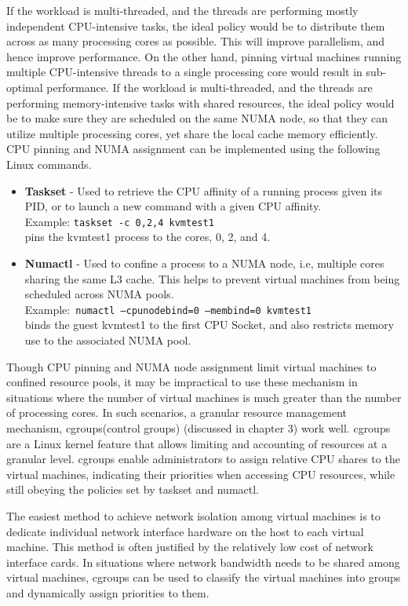 If the workload is multi-threaded, and the threads are performing mostly independent CPU-intensive tasks, the ideal policy would be to distribute them across as many processing cores as possible. This will improve parallelism, and hence improve performance. On the other hand, pinning virtual machines running multiple CPU-intensive threads to a single processing core would result in sub-optimal performance. If the workload is multi-threaded, and the threads are performing memory-intensive tasks with shared resources, the ideal policy would be to make sure they are scheduled on the same NUMA node, so that they can utilize multiple processing cores, yet share the local cache memory efficiently. CPU pinning and NUMA assignment can be implemented using the following Linux commands. 
\begin{itemize}
\item\textbf{ Taskset }\cite{taskset} - Used to retrieve the CPU affinity of a running process given its PID, or to launch a new command with a given CPU affinity. \\
Example: \texttt{taskset -c 0,2,4 kvmtest1} \\
pins the kvmtest1 process to the cores, 0, 2, and 4.
\item \textbf{Numactl} \cite{numactl} - Used to confine a process to a NUMA node, i.e, multiple cores sharing the same L3 cache. This helps to prevent virtual machines from being scheduled across NUMA pools.\\
Example:\texttt{ numactl --cpunodebind=0 --membind=0 kvmtest1 }\\
binds the guest kvmtest1 to the first CPU Socket, and also restricts memory use to the associated NUMA pool.
\end{itemize}
Though CPU pinning and NUMA node assignment limit virtual machines to confined resource pools, it may be impractical to use these mechanism in situations where the number of virtual machines is much greater than the number of processing cores. In such scenarios, a granular resource management mechanism, cgroups(control groups) (discussed in chapter 3) work well. cgroups are a Linux kernel feature that allows limiting and accounting of resources at a granular level. cgroups enable administrators to assign relative CPU shares to the virtual machines, indicating their priorities when accessing CPU resources, while still obeying the policies set by taskset and numactl.


The easiest method to achieve network isolation among virtual machines is to dedicate individual network interface hardware on the host to each virtual machine. This method is often justified by the relatively low cost of network interface cards. In situations where network bandwidth needs to be shared among virtual machines, cgroups can be used to classify the virtual machines into groups and dynamically assign priorities to them.

